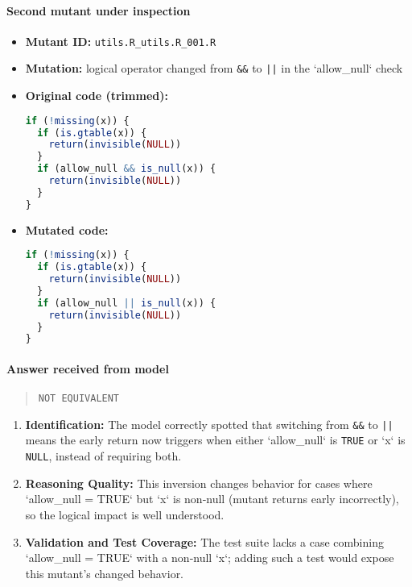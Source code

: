 \paragraph{Second mutant under inspection}
\begin{itemize}
  \item \textbf{Mutant ID:} \texttt{utils.R\_utils.R\_001.R}
  \item \textbf{Mutation:} logical operator changed from \texttt{\&\&} to \texttt{||} in the `allow\_null` check
  \item \textbf{Original code (trimmed):}
    \begin{lstlisting}[language=R]
if (!missing(x)) {
  if (is.gtable(x)) {
    return(invisible(NULL))
  }
  if (allow_null && is_null(x)) {
    return(invisible(NULL))
  }
}
    \end{lstlisting}
  \item \textbf{Mutated code:}
    \begin{lstlisting}[language=R]
if (!missing(x)) {
  if (is.gtable(x)) {
    return(invisible(NULL))
  }
  if (allow_null || is_null(x)) {
    return(invisible(NULL))
  }
}
    \end{lstlisting}
\end{itemize}

\paragraph{Answer received from model}
\begin{quote}
\texttt{NOT EQUIVALENT}
\end{quote}

\begin{enumerate}
  \item \textbf{Identification:}  
    The model correctly spotted that switching from \texttt{\&\&} to \texttt{||} means the early return now triggers when either `allow\_null` is \texttt{TRUE} or `x` is \texttt{NULL}, instead of requiring both.

  \item \textbf{Reasoning Quality:}  
    This inversion changes behavior for cases where `allow\_null = TRUE` but `x` is non‐null (mutant returns early incorrectly), so the logical impact is well understood.

  \item \textbf{Validation and Test Coverage:}  
    The test suite lacks a case combining `allow\_null = TRUE` with a non‐null `x`; adding such a test would expose this mutant’s changed behavior.
\end{enumerate}

